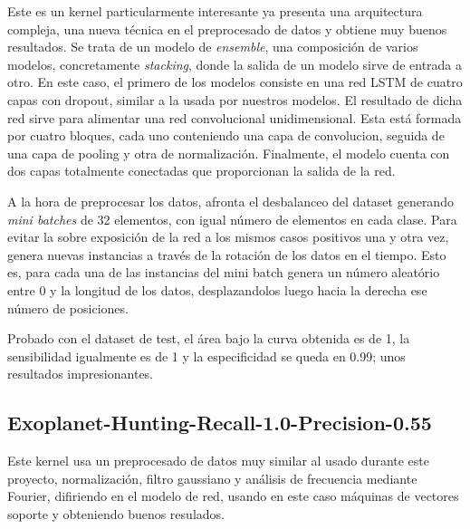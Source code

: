 Este es un kernel particularmente interesante ya presenta una arquitectura compleja, una nueva técnica en el preprocesado de datos y obtiene muy buenos resultados. Se trata de un modelo de \textit{ensemble}, una composición de varios modelos, concretamente \textit{stacking}, donde la salida de un modelo sirve de entrada a otro. En este caso, el primero de los modelos consiste en una red LSTM de cuatro capas con dropout, similar a la usada por nuestros modelos. El resultado de dicha red sirve para alimentar una red convolucional unidimensional. Esta está formada por cuatro bloques, cada uno conteniendo una capa de convolucion, seguida de una capa de pooling y otra de normalización. Finalmente, el modelo cuenta con dos capas totalmente conectadas que proporcionan la salida de la red.

A la hora de preprocesar los datos, afronta el desbalanceo del dataset generando \textit{mini batches} de 32 elementos, con igual número de elementos en cada clase. Para evitar la sobre exposición de la red a los mismos casos positivos una y otra vez, genera nuevas instancias a través de la rotación de los datos en el tiempo. Esto es, para cada una de las instancias del mini batch genera un número aleatório entre 0 y la longitud de los datos, desplazandolos luego hacia la derecha ese número de posiciones. 

Probado con el dataset de test, el área bajo la curva obtenida es de 1, la sensibilidad igualmente es de 1 y la especificidad se queda en 0.99; unos resultados impresionantes. 

\subsection{Exoplanet-Hunting-Recall-1.0-Precision-0.55 \cite{Kaggle-kernel-Exoplanet-Hunting}} 

Este kernel usa un preprocesado de datos muy similar al usado durante este proyecto, normalización, filtro gaussiano y análisis de frecuencia mediante Fourier, difiriendo en el modelo de red, usando en este caso máquinas de vectores soporte y obteniendo buenos resulados.

